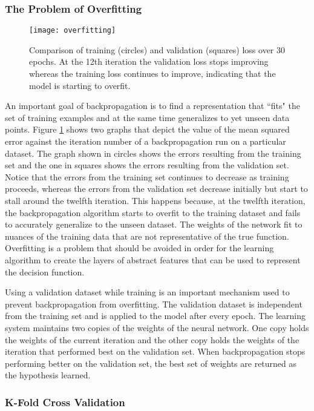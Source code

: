 \subsubsection{The Problem of Overfitting}

\begin{figure}[t]
	\centering
	\texttt{[image: overfitting]}
	\caption{Comparison of training (circles) and validation (squares) loss over 30 epochs. At the 12th iteration the validation loss stops improving whereas the training loss continues to improve, indicating that the model is starting to overfit.}
	\label{fig:overfitting}
\end{figure}

An important goal of backpropagation is to find a representation that ``fits" the set of training examples and at the same time generalizes to yet unseen data points. Figure \ref{fig:overfitting} shows two graphs that depict the value of the mean squared error against the iteration number of a backpropagation run on a particular dataset. The graph shown in circles shows the errors resulting from the training set and the one in squares shows the errors resulting from the validation set. Notice that the errors from the training set continues to decrease as training proceeds, whereas the errors from the validation set decrease initially but start to stall around the twelfth iteration. This happens because, at the twelfth iteration, the backpropagation algorithm starts to overfit to the training dataset and fails to accurately generalize to the unseen dataset. The weights of the network fit to nuances of the training data that are not representative of the true function. Overfitting is a problem that should be avoided in order for the learning algorithm to create the layers of abstract features that can be used to represent the decision function\cite{Mitchell}.

Using a validation dataset while training is an important mechanism used to prevent backpropagation from overfitting. The validation dataset is independent from the training set and is applied to the model after every epoch. The learning system maintains two copies of the weights of the neural network. One copy holds the weights of the current iteration and the other copy holds the weights of the iteration that performed best on the validation set. When backpropagation stops performing better on the validation set, the best set of weights are returned as the hypothesis learned\cite{Mitchell}.

\subsubsection{K-Fold Cross Validation}

